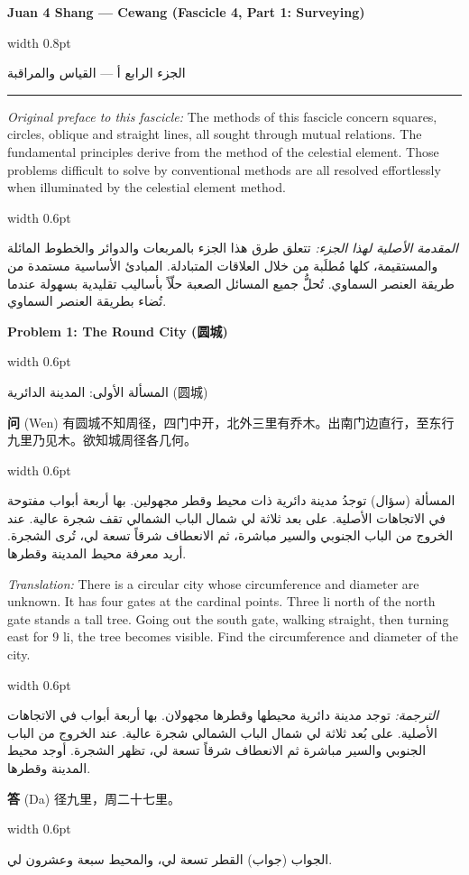 \documentclass[11pt,a4paper]{article}
\newlength{\cnwidth}
\newlength{\arwidth}
\newcommand{\paralleltext}[2]{%
  \par\medskip\noindent
  \begin{minipage}[t]{\cnwidth}%
    \small #1%
  \end{minipage}%
  \hfill\textcolor{colrule}{\vrule width 0.6pt}\hfill
  \begin{minipage}[t]{\arwidth}%
    \small\arabicfont\beginR #2\endR%
  \end{minipage}%
  \par\medskip
}
\newcommand{\parallelsection}[2]{%
  \par\bigskip\noindent
  \begin{minipage}[t]{\cnwidth}%
    \Large\bfseries\color{sectioncolor} #1%
  \end{minipage}%
  \hfill\textcolor{colrule}{\vrule width 0.8pt}\hfill
  \begin{minipage}[t]{\arwidth}%
    \Large\arabicfontbf\color{sectioncolor}\beginR #2\endR%
  \end{minipage}%
  \par\medskip\noindent\textcolor{colrule}{\rule{\textwidth}{0.6pt}}\par\medskip
}
\newcommand{\parallelsubsection}[2]{%
  \par\medskip\noindent
  \begin{minipage}[t]{\cnwidth}%
    \large\bfseries\color{sectioncolor} #1%
  \end{minipage}%
  \hfill\textcolor{colrule}{\vrule width 0.6pt}\hfill
  \begin{minipage}[t]{\arwidth}%
    \large\arabicfontbf\color{sectioncolor}\beginR #2\endR%
  \end{minipage}%
  \par\smallskip
}
\newcommand{\cnlabel}[1]{\textbf{\color{notecolor}#1}}
\newcommand{\arlabel}[1]{\arabicfontbf\color{notecolor}\beginR #1\endR}
\begin{document}
\newpage

\parallelsection{Juan 4 Shang — Cewang (Fascicle 4, Part 1: Surveying)}{الجزء الرابع أ — القياس والمراقبة}

\paralleltext{%
\textit{Original preface to this fascicle:} The methods of this fascicle concern squares, circles, oblique and straight lines, all sought through mutual relations. The fundamental principles derive from the method of the celestial element. Those problems difficult to solve by conventional methods are all resolved effortlessly when illuminated by the celestial element method.
}{%
\textit{المقدمة الأصلية لهذا الجزء:} تتعلق طرق هذا الجزء بالمربعات والدوائر والخطوط المائلة والمستقيمة، كلها مُطلَبة من خلال العلاقات المتبادلة. المبادئ الأساسية مستمدة من طريقة العنصر السماوي. تُحلُّ جميع المسائل الصعبة حلّاً بأساليب تقليدية بسهولة عندما تُضاء بطريقة العنصر السماوي.
}

\parallelsubsection{Problem 1: The Round City (圆城)}{المسألة الأولى: المدينة الدائرية (圆城)}

\paralleltext{%
\cnlabel{问} (Wen) 有圆城不知周径，四门中开，北外三里有乔木。出南门边直行，至东行九里乃见木。欲知城周径各几何。
}{%
\arlabel{المسألة} (سؤال) توجدُ مدينة دائرية ذات محيط وقطر مجهولين. بها أربعة أبواب مفتوحة في الاتجاهات الأصلية. على بعد ثلاثة لي شمال الباب الشمالي تقف شجرة عالية. عند الخروج من الباب الجنوبي والسير مباشرة، ثم الانعطاف شرقاً تسعة لي، تُرى الشجرة. أريد معرفة محيط المدينة وقطرها.
}

\paralleltext{%
\textit{Translation:} There is a circular city whose circumference and diameter are unknown. It has four gates at the cardinal points. Three li north of the north gate stands a tall tree. Going out the south gate, walking straight, then turning east for 9 li, the tree becomes visible. Find the circumference and diameter of the city.
}{%
\textit{الترجمة:} توجد مدينة دائرية محيطها وقطرها مجهولان. بها أربعة أبواب في الاتجاهات الأصلية. على بُعد ثلاثة لي شمال الباب الشمالي شجرة عالية. عند الخروج من الباب الجنوبي والسير مباشرة ثم الانعطاف شرقاً تسعة لي، تظهر الشجرة. أوجد محيط المدينة وقطرها.
}

\paralleltext{%
\cnlabel{答} (Da) 径九里，周二十七里。
}{%
\arlabel{الجواب} (جواب) القطر تسعة لي، والمحيط سبعة وعشرون لي.
}
\end{document}
